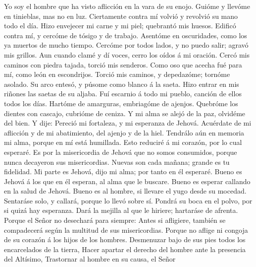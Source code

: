 Yo soy el hombre que ha visto aflicción en la vara de su
enojo.  Guióme y llevóme en tinieblas, mas no en luz.
 Ciertamente contra mí volvió y revolvió su mano todo el
día.  Hizo envejecer mi carne y mi piel; quebrantó mis
huesos.  Edificó contra mí, y cercóme de tósigo y de
trabajo.  Asentóme en oscuridades, como los ya muertos de
mucho tiempo.  Cercóme por todos lados, y no puedo salir;
agravó mis grillos.  Aun cuando clamé y dí voces, cerro
los oídos á mi oración.  Cercó mis caminos con piedra
tajada, torció mis senderos.  Como oso que acecha fué
para mí, como león en escondrijos.  Torció mis caminos, y
depedazóme; tornóme asolado.  Su arco entesó, y púsome
como blanco á la saeta.  Hizo entrar en mis riñones las
saetas de su aljaba.  Fuí escarnio á todo mi pueblo,
canción de ellos todos los días.  Hartóme de amarguras,
embriagóme de ajenjos.  Quebróme los dientes con cascajo,
cubrióme de ceniza.  Y mi alma se alejó de la paz,
olvidéme del bien.  Y dije: Pereció mi fortaleza, y mi
esperanza de Jehová.  Acuérdate de mi aflicción y de mi
abatimiento, del ajenjo y de la hiel.  Tendrálo aún en
memoria mi alma, porque en mí está humillada.  Esto
reduciré á mi corazón, por lo cual esperaré.  Es por la
misericordia de Jehová que no somos consumidos, porque nunca decayeron
sus misericordias.  Nuevas son cada mañana; grande es tu
fidelidad.  Mi parte es Jehová, dijo mi alma; por tanto
en él esperaré.  Bueno es Jehová á los que en él esperan,
al alma que le buscare.  Bueno es esperar callando en la
salud de Jehová.  Bueno es al hombre, si llevare el yugo
desde su mocedad.  Sentaráse solo, y callará, porque lo
llevó sobre sí.  Pondrá su boca en el polvo, por si quizá
hay esperanza.  Dará la mejilla al que le hiriere;
hartaráse de afrenta.  Porque el Señor no desechará para
siempre:  Antes si afligiere, también se compadecerá
según la multitud de sus misericordias.  Porque no aflige
ni congoja de su corazón á los hijos de los hombres. 
Desmenuzar bajo de sus pies todos los encarcelados de la tierra,
 Hacer apartar el derecho del hombre ante la presencia
del Altísimo,  Trastornar al hombre en su causa, el Señor
